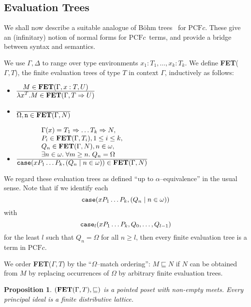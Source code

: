\documentclass[11pt]{article}
\newtheorem{proposition}[theorem]{Proposition}
\newcommand{\pcfc}{\mbox{$\mbox{PCF}c$}}
\newcommand{\finevalT}[2]{\mbox{{\bf FET}($#1,#2$)}}
\newcommand{\twotrans}[2]{\mbox{$\frac{\mbox{$#1$}}{\mbox{$#2$}}$}}
\newcommand{\lpo}{\mbox{$\sqsubseteq$}}
\begin{document}
\subsection{Evaluation Trees}

We shall now describe a suitable analogue of B\"{o}hm
trees~\cite{BarendregtHP:lamcss}
for \pcfc.  These give an (infinitary) notion of normal forms for
\pcfc\ terms, and provide a bridge between syntax and semantics.

We use $\Gamma, \Delta $ to range over type environments $x_1: T_1,
\ldots, x_k: T_k$.  We define \finevalT{\Gamma}{T}, the finite
evaluation trees of type $T$ in context $\Gamma$, inductively as
follows:
\begin{itemize}

\item \twotrans{M \in \finevalT{\Gamma,x:T}{U}}{\lambda x^T. M \in
    \finevalT{\Gamma}{T \Rightarrow U}}

\item \twotrans{}{\Omega, {\tt n} \in \finevalT{\Gamma}{N}}

\item \twotrans{
\begin{array}{l}
\Gamma(x) = T_1 \Rightarrow \ldots T_k \Rightarrow N, \\
 P_i \in \finevalT{\Gamma}{T_i}, 1 \leq i \leq k, \\ Q_n \in
    \finevalT{\Gamma}{N}, n \in \omega, \\ \exists n \in \omega. \;
    \forall m \geq n. \; Q_n = \Omega
\end{array}
}{{\tt case}(xP_1 \ldots P_k, (Q_n
    \mid n \in \omega)) \in \finevalT{\Gamma}{N}}
\end{itemize}

We regard these evaluation trees as defined ``up to
$\alpha$--equivalence'' in the usual sense. Note that if we
identify each $${\tt case}(xP_1 \ldots P_k, (Q_n \mid n \in
\omega))$$ with $${\tt case}_{l}(xP_1 \ldots P_k, Q_0, \ldots,
Q_{l-1})$$ for the least $l$ such that $Q_n = \Omega$ for all $n
\geq l$, then every finite evaluation tree is a term in \pcfc.

We order \finevalT{\Gamma}{T} by the ``$\Omega$--match ordering'':
$M\lpo N$ if $N$ can be obtained from $M$ by replacing
occurrences of $\Omega$ by arbitrary finite evaluation trees.

\begin{proposition}\label{A}
$(\finevalT{\Gamma}{T}, \lpo)$ is a pointed poset with non-empty
meets.  Every principal ideal is a finite distributive lattice.
\end{proposition}
\end{document}
